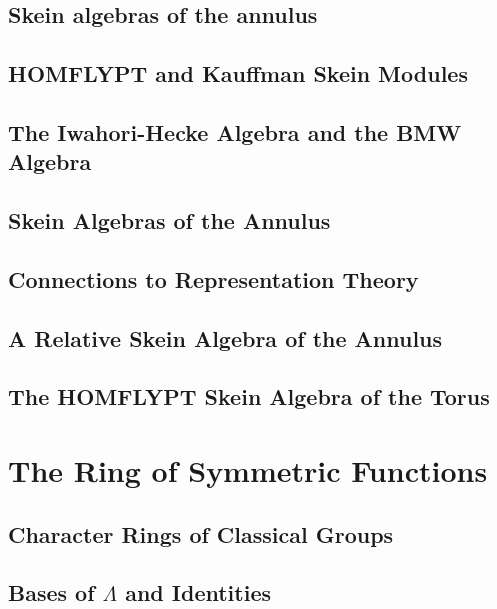 \subsection{Skein algebras of the annulus}

\subsection{HOMFLYPT and Kauffman Skein Modules}

\subsection{The Iwahori-Hecke Algebra and the BMW Algebra}

\subsection{Skein Algebras of the Annulus}

\subsection{Connections to Representation Theory}

\subsection{A Relative Skein Algebra of the Annulus}

\subsection{The HOMFLYPT Skein Algebra of the Torus}



\section{The Ring of Symmetric Functions}

\subsection{Character Rings of Classical Groups}

\subsection{Bases of $\Lambda$ and Identities}